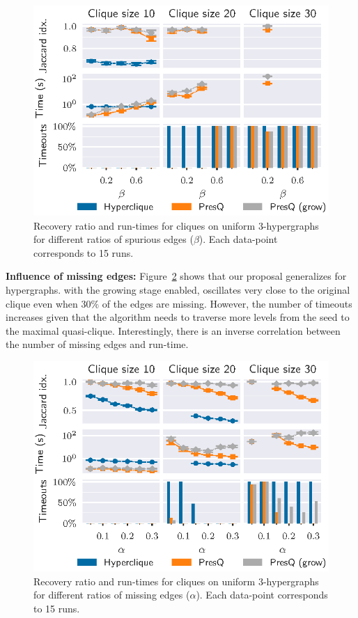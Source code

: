 \begin{figure}[ht]
    \centering
    \includegraphics{images/5_presq/3hyper_beta}
    \caption[Recovery ratio and run-times for cliques on uniform $3$-hypergraphs for different ratios of spurious edges.]{
        Recovery ratio and run-times for cliques on uniform $3$-hypergraphs
        for different ratios of spurious edges ($\beta$).
        Each data-point corresponds to 15 runs.
    }
    \label{fig:3hyper_beta}
\end{figure}

\textbf{Influence of missing edges:}
Figure~\ref{fig:3hyper_alpha} shows that our proposal
generalizes for hypergraphs. \PresQ with the growing stage enabled, oscillates very close
to the original clique even when $30\%$ of the edges are missing. However, the number of
timeouts increases given that the algorithm needs to traverse more levels from the seed to the maximal
quasi-clique. Interestingly, there is an inverse correlation between the number
of missing edges and run-time.

\begin{figure}[ht]
    \centering
    \includegraphics{images/5_presq/3hyper_alpha}
    \caption[Recovery ratio and run-times for cliques on uniform $3$-hypergraphs
    for different ratios of missing edges.]{Recovery ratio and run-times for cliques on uniform $3$-hypergraphs
    for different ratios of missing edges ($\alpha$).
    Each data-point corresponds to 15 runs.}
    \label{fig:3hyper_alpha}
\end{figure}

